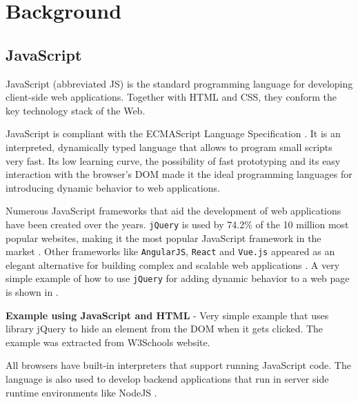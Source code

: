 \chapter{Background}\label{chap:background}
\section{JavaScript} \label{sec:background-javascript}
JavaScript (abbreviated JS) is the standard programming language for developing client-side web applications. Together with HTML and CSS, they conform the key technology stack of the Web.

JavaScript is compliant with the ECMAScript Language Specification \citep{ecma-script}. It is an interpreted, dynamically typed language that allows to program small scripts very fast.  Its low learning curve, the possibility of fast prototyping and its easy interaction with the browser's DOM made it the ideal programming languages for introducing dynamic behavior to web applications.

Numerous JavaScript frameworks that aid the development of web applications have been created over the years. \texttt{jQuery} is used by 74.2\% of the 10 million most popular websites, making it the most popular JavaScript framework in the market \citep{jquery}\citep{w3techs-javascript-libraries-statistics}. Other frameworks like \texttt{AngularJS}, \texttt{React} and \texttt{Vue.js} appeared as an elegant alternative for building complex and scalable web applications \citep{angularjs}\citep{react}\citep{vuejs}. A very simple example of how to use \texttt{jQuery} for adding dynamic behavior to a web page is shown in .

\begin{code}
	\captionsetup{aboveskip=0pt, belowskip=10pt}
	\caption[Example using JavaScript and HTML]{\textbf{Example using JavaScript and HTML} - Very simple example that uses library jQuery to hide an element from the DOM when it gets clicked. The example was extracted from W3Schools website.}
	\label{code:background-jquery-example}
\end{code}

All browsers have built-in interpreters that support running JavaScript code. The language is also used to develop backend applications that run in server side runtime environments like NodeJS \citep{nodejs}.

